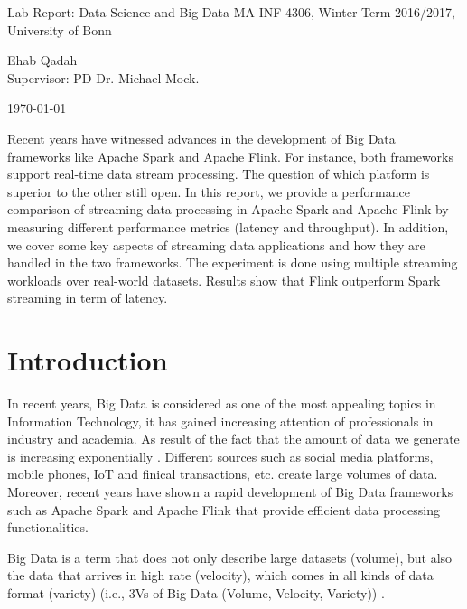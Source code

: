 \documentclass[]{article}
\begin{document}
\begin{flushleft}

\vspace{4pt}

\centering
 Lab Report: Data Science and Big Data MA-INF 4306,
 Winter Term 2016/2017, University of Bonn

\vspace{4pt}
\centering
 Ehab Qadah\\
 Supervisor: PD Dr. Michael Mock.
 \vspace{4pt}
 
 \today
\end{flushleft}


\begin{abstract}

\end{abstract}
Recent years have witnessed advances in the  development of Big Data frameworks like Apache Spark and Apache Flink. For instance, both frameworks support real-time data 
stream processing. The question of which platform is superior to the other still open. 
In this report, we provide a performance comparison of streaming data processing in Apache Spark and Apache Flink by measuring different performance metrics (latency and throughput). In addition, we cover some key aspects of streaming data applications and how they are handled in the two frameworks. The experiment is done using multiple streaming workloads over real-world datasets. Results show that Flink outperform Spark streaming in term of latency.  
\section{Introduction}

\par In recent years, Big Data is considered as one of the most appealing topics in Information Technology, it has gained increasing attention of professionals in industry and academia. As result of the fact that the amount of data we generate is increasing exponentially \cite{idc}.  Different sources such as  social media platforms, mobile phones, IoT and finical transactions, etc.  create large volumes of data.  Moreover, recent years have shown a rapid development of Big Data frameworks such as Apache Spark and Apache Flink that provide efficient data processing functionalities.
 \par Big Data is a term that does not only describe large datasets (volume), but also the data that arrives in high rate (velocity), which comes in all kinds of data format (variety) (i.e., 3Vs of Big Data (Volume, Velocity, Variety)) \cite{svs}.
\end{document}
